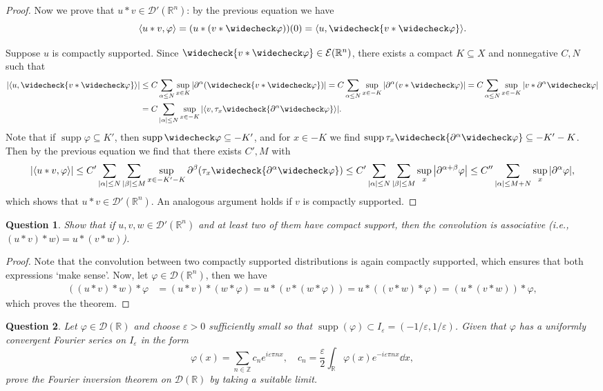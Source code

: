 \documentclass{article}
\theoremstyle{plain}
\newtheorem{question}{Question}
\theoremstyle{remark}
\renewcommand{\epsilon}{\varepsilon}
\renewcommand{\phi}{\varphi}
\newcommand{\Bb}{\mathbb}
\newcommand{\Cal}{\mathcal}
\newcommand\ZZ{\Bb Z}
\newcommand{\RR}{\Bb R}
\newcommand{\DD}{\Cal D}
\newcommand\EE{\Cal E}
\DeclarePairedDelimiter{\ang}{\langle}{\rangle}
\newcommand\eps\epsilon
\newcommand\pt\partial
\newcommand\refl\widecheck
\DeclareMathOperator{\supp}{supp}
\begin{document}
\begin{proof}
	Now we prove that $u * v \in \DD'(\RR^n)$: by the previous equation we have
	\[
	\ang{u * v, \phi} = (u * (v * \refl\phi))(0) = \ang{u, \refl{v * \refl\phi}}.
	\]
	
	Suppose $u$ is compactly supported. Since $\refl{v * \refl\phi} \in \EE(\RR^n)$, there exists a compact $K \subseteq X$ and nonnegative $C, N$ such that
	\begin{align*}
		\abs{\ang{u, \refl{v * \refl\phi}}} &\leq C \sum_{\alpha \leq N} \sup_{x \in K} \abs{\pt^\alpha (\refl{v * \refl\phi})} = C \sum_{\alpha \leq N} \sup_{x \in -K} \abs{\pt^\alpha (v * \refl\phi)} = C \sum_{\alpha \leq N} \sup_{x \in -K} \abs{v * \pt^\alpha\refl\phi}\\
		&= C \sum_{\abs{\alpha} \leq N} \sup_{x \in -K} \abs{\ang{v, \tau_x \refl{\pt^\alpha \refl\phi}}}.
	\end{align*}
	Note that if $\supp\phi \subseteq K'$, then $\supp\refl\phi \subseteq -K'$, and for $x \in -K$ we find $\supp \tau_x \refl{\pt^\alpha \refl\phi} \subseteq -K' -K$. Then by the previous equation we find that there exists $C', M$ with
	\[
	\abs{\ang{u * v, \phi}} \leq C' \sum_{\abs{\alpha} \leq N} \sum_{\abs{\beta} \leq M} \sup_{x \in -K' - K} \pt^\beta (\tau_x \refl{\pt^\alpha \refl\phi}) \leq C' \sum_{\abs{\alpha} \leq N} \sum_{\abs{\beta} \leq M} \sup_x \abs{\pt^{\alpha + \beta} \phi} \leq C'' \sum_{\abs{\alpha} \leq M + N} \sup_x \abs{\pt^\alpha \phi},
	\]
	which shows that $u* v \in \DD'(\RR^n)$. An analogous argument holds if $v$ is compactly supported. 
\end{proof}

\begin{question}
	Show that if $u, v, w \in \DD'(\RR^n)$ and at least two of them have compact support, then the convolution is associative (i.e., $(u * v) * w) = u* (v * w)$). 
\end{question}

\begin{proof}
	Note that the convolution between two compactly supported distributions is again compactly supported, which ensures that both expressions `make sense'. Now, let $\phi \in \DD(\RR^n)$, then we have
	\begin{align*}
		((u * v) * w) * \phi &= (u* v) * (w * \phi) = u * (v * ( w* \phi)) = u * ((v * w) * \phi) = (u * (v * w)) * \phi,
	\end{align*}
	which proves the theorem. 
\end{proof}

\begin{question}
	Let $\phi \in \DD(\RR)$ and choose $\eps > 0$ sufficiently small so that $\supp(\phi) \subset I_\eps = (-1/\eps, 1/\eps)$. Given that $\phi$ has a uniformly convergent Fourier series on $I_\eps$ in the form
	\[
	\phi(x) = \sum_{n \in \ZZ} c_n e^{i \eps \pi n x}, \quad c_n = \frac\eps2 \int_\RR \phi(x) e^{-i\eps \pi n x} \dd{x},
	\]
	prove the Fourier inversion theorem on $\DD(\RR)$ by taking a suitable limit. 
\end{question}
\end{document}
